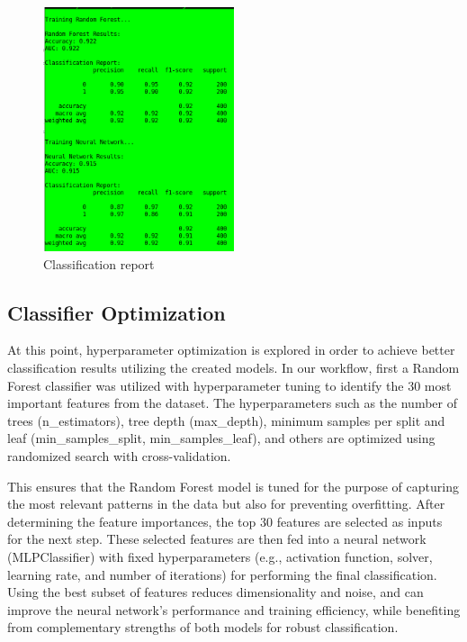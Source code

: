 \documentclass[11pt,a4paper]{article}
\begin{document}
		\begin{figure}[H]
			\centering
			\includegraphics[width=0.5\textwidth]{images/report_all_features.png}
			\caption{Classification report}
			\label{fig1:}
		\end{figure}		
		

		\subsection{Classifier Optimization}

		At this point, hyperparameter optimization is explored in order to achieve better classification
		results utilizing the created models.
		In our workflow,  first a Random Forest classifier was utilized with hyperparameter tuning 
		to identify the 30 most important features from the dataset. 
		The hyperparameters such as the number of trees (n\_estimators), tree depth (max\_depth), 
		minimum samples per split and leaf (min\_samples\_split, min\_samples\_leaf), 
		and others are optimized using randomized search with cross-validation. 
		
		This ensures that the Random Forest model is tuned for the purpose of capturing
		the most relevant patterns in the data but also for preventing overfitting. 
		After determining the feature importances, the top 30 features are selected as inputs for the next step.
		These selected features are then fed into a neural network (MLPClassifier) 
		with fixed hyperparameters (e.g., activation function, solver, learning rate, and number of iterations) for
		performing the final classification. 
		Using the best subset of features reduces dimensionality and noise, and can improve the 
		neural network’s performance and training efficiency, 
		while benefiting from complementary strengths of both models for robust classification.
		
\end{document}
